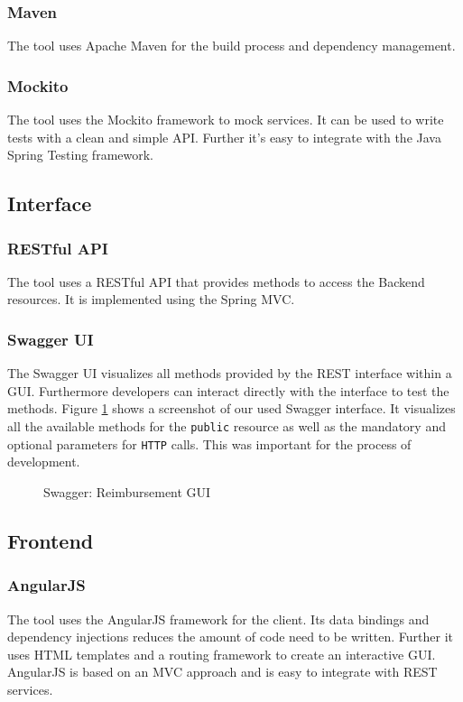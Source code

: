 \subsubsection{Maven}
The tool uses Apache Maven \cite{maven} for the build process and dependency management.

\subsubsection{Mockito}
The tool uses the Mockito framework to mock services. It can be used to write tests with a clean and simple API. Further it's easy to integrate with the Java Spring Testing framework. \cite{mockito}

\subsection{Interface}

\subsubsection{RESTful API}
\label{sec:restfulapi}
The tool uses a RESTful API that provides methods to access the Backend resources. It is implemented using the Spring MVC. 

\subsubsection{Swagger UI}
The Swagger UI visualizes all methods provided by the REST interface within a GUI. Furthermore developers can interact directly with the interface to test the methods. Figure \ref{fig:swagger01} shows a screenshot of our used Swagger interface. It visualizes all the available methods for the \texttt{public} resource as well as the mandatory and optional parameters for \texttt{HTTP} calls. This was important for the process of development. \cite{swagger}

\begin{figure}[H]
    \centering
    \caption{Swagger: Reimbursement GUI}
    \label{fig:swagger01}
\end{figure}

\subsection{Frontend}

\subsubsection{AngularJS}
The tool uses the AngularJS framework for the client. Its data bindings and dependency injections reduces the amount of code need to be written. Further it uses HTML templates and a routing framework to create an interactive GUI. AngularJS is based on an MVC approach and is easy to integrate with REST services. \cite{angular}   

